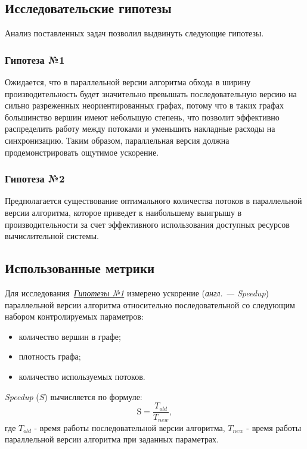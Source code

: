 \subsection{Исследовательские гипотезы}
Анализ поставленных задач позволил выдвинуть следующие гипотезы.
{\parindent0pt
    
    \subsubsection*{Гипотеза №1}
    \label{t1}
    Ожидается, что в параллельной версии алгоритма обхода в ширину производительность будет значительно превышать последовательную версию на сильно разреженных неориентированных графах, потому что в таких графах большинство вершин имеют небольшую степень, что позволит эффективно распределить работу между потоками и уменьшить накладные расходы на синхронизацию. Таким образом, параллельная версия должна продемонстрировать ощутимое ускорение.
}
{\parindent0pt
    \subsubsection*{Гипотеза №2}
    \label{t2}
    Предполагается существование оптимального количества потоков в параллельной версии алгоритма, которое приведет к наибольшему выигрышу в производительности за счет эффективного использования доступных ресурсов вычислительной системы.
}



\subsection{Использованные метрики}
Для исследования~\hyperref[t1]{\textit{Гипотезы №1}} измерено ускорение (\textit{англ. --- Speedup}) параллельной версии алгоритма относительно последовательной со следующим набором контролируемых параметров:
\begin{itemize}
    \item количество вершин в графе;
    \item плотность графа;
    \item количество используемых потоков.
\end{itemize}
\textit{Speedup} ($S$) вычисляется по формуле:
\begin{equation}
\label{eq:speedup}
	\text{S} = \frac{T_{old}}{T_{new}},
\end{equation}
где $T_{old}$ - время работы последовательной версии алгоритма, $T_{new}$ - время работы параллельной версии алгоритма при заданных параметрах.

